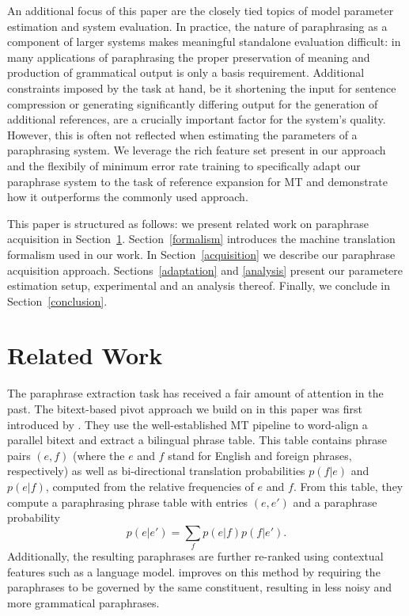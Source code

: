 \documentclass[11pt]{article}
\newcommand{\mnote}[1]{\marginpar{%
  \vskip-\baselineskip
  \raggedright\footnotesize
  \itshape\hrule\smallskip\tiny{#1}\par\smallskip\hrule}}
\begin{document}
An additional focus of this paper are the closely tied topics of model
parameter estimation and system evaluation. In practice, the nature of
paraphrasing as a component of larger systems makes meaningful
standalone evaluation difficult: in many applications of paraphrasing
the proper preservation of meaning and production of grammatical
output is only a basis requirement. Additional constraints imposed by
the task at hand, be it shortening the input for sentence compression
or generating significantly differing output for the generation of
additional references, are a crucially important factor for the
system's quality. However, this is often not reflected when estimating
the parameters of a paraphrasing system. We leverage the rich feature
set present in our approach and the flexibily of minimum error rate
training to specifically adapt our paraphrase system to the task of
reference expansion for MT and demonstrate how it outperforms the
commonly used approach.

This paper is structured as follows: we present related work on
paraphrase acquisition in
Section~\ref{related_work}. Section~\ref{formalism} introduces the
machine translation formalism used in our work. In
Section~\ref{acquisition} we describe our paraphrase acquisition
approach. Sections~\ref{adaptation} and \ref{analysis} present our
parametere estimation setup, experimental and an analysis
thereof. Finally, we conclude in Section~\ref{conclusion}.

\section{Related Work} \label{related_work}

The paraphrase extraction task has received a fair amount of attention
in the past. The bitext-based pivot approach we build on in this paper
was first introduced by . They use the
well-established MT pipeline \mnote{Cite MT papers?} to word-align a
parallel bitext and extract a bilingual phrase table. This table
contains phrase pairs $(e, f)$ (where the $e$ and $f$ stand for
English and foreign phrases, respectively) as well as bi-directional
translation probabilities $p(f | e)$ and $p(e | f)$, computed from the
relative frequencies of $e$ and $f$. From this table, they compute a
paraphrasing phrase table with entries $(e, e')$ and a paraphrase
probability
\begin{equation}
p(e | e') = \sum_f p(e | f) p(f | e') .
\end{equation}
Additionally, the resulting paraphrases are further re-ranked using
contextual features such as a language
model.  improves on this method by
requiring the paraphrases to be governed by the same constituent,
resulting in less noisy and more grammatical paraphrases.
\end{document}
